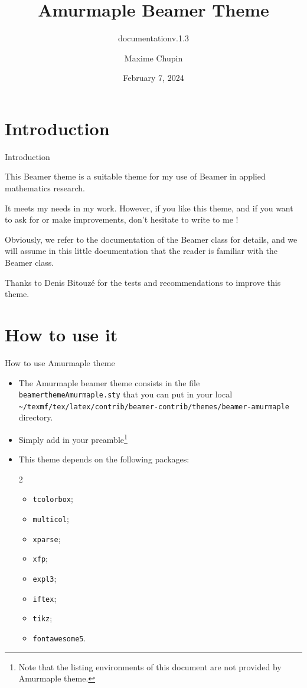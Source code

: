 \documentclass[10pt,aspectratio=169,english]{beamer}
\title[Amurmaple documentation]{Amurmaple Beamer Theme}
\author[M.~Chupin]{Maxime Chupin}
\subtitle{documentation\quad v.1.3}
\institute[CNRS]{CNRS\\
University of Paris-Dauphine}
\date{February 7, 2024}
\begin{document}
\maketitle

\sepframe[title={Table of contents}]
\section{Introduction}

\begin{frame}{Introduction}
\begin{information}
This Beamer theme is  a suitable theme for my use of Beamer in applied
mathematics research.

It meets my needs in my work. However, if you like this theme, and if you want
to ask for or make improvements, don't hesitate to write to me !

Obviously, we refer to the documentation of the Beamer class for details, and we
will assume in this little documentation that the reader is familiar with the
Beamer class.
\end{information}
Thanks to Denis Bitouzé for the tests and recommendations to improve this
theme.
\end{frame}


\section{How to use it}

\sepframe

\begin{frame}[fragile]{How to use Amurmaple theme}
  \begin{itemize}
  \item The Amurmaple beamer theme consists in the file
    \texttt{beamerthemeAmurmaple.sty} that you can put in your local
    \texttt{\~{}/texmf/tex/latex/contrib/beamer-contrib/themes/beamer-amurmaple}
    directory.
  \item Simply add in your preamble\footnote{Note that the listing environments
      of this document are not provided by Amurmaple theme.}
\item This theme depends on the following packages:
  \begin{multicols}{2}
  \begin{itemize}
  \item \lstinline+tcolorbox+;
  \item \lstinline+multicol+;
  \item \lstinline+xparse+;
  \item \lstinline+xfp+;
  \item \lstinline+expl3+;
  \item \lstinline+iftex+;
  \item \lstinline+tikz+;
  \item \lstinline+fontawesome5+.
  \end{itemize}
\end{multicols}
\end{itemize}
\end{frame}
\end{document}

